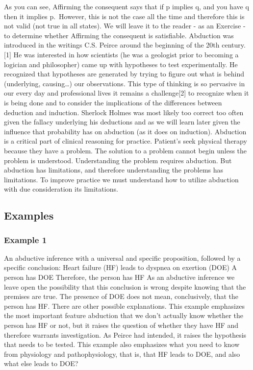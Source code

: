 \documentclass[
]{book}
\begin{document}
As you can see, Affirming the consequent says that if p implies q, and you have q then it implies p.~However, this is not the case all the time and therefore this is not valid (not true in all states). We will leave it to the reader - as an Exercise - to determine whether Affirming the consequent is satisfiable.
Abduction was introduced in the writings C.S. Peirce around the beginning of the 20th century.{[}1{]} He was interested in how scientists (he was a geologist prior to becoming a logician and philosopher) came up with hypotheses to test experimentally. He recognized that hypotheses are generated by trying to figure out what is behind (underlying, causing\ldots) our observations. This type of thinking is so pervasive in our every day and professional lives it remains a challenge{[}2{]} to recognize when it is being done and to consider the implications of the differences between deduction and induction. Sherlock Holmes was most likely too correct too often given the fallacy underlying his deductions and as we will learn later given the influence that probability has on abduction (as it does on induction).
Abduction is a critical part of clinical reasoning for practice. Patient's seek physical therapy because they have a problem. The solution to a problem cannot begin unless the problem is understood. Understanding the problem requires abduction. But abduction has limitations, and therefore understanding the problems has limitations. To improve practice we must understand how to utilize abduction with due consideration its limitations.

\hypertarget{examples-1}{%
\subsection{Examples}\label{examples-1}}

\hypertarget{example-1-1}{%
\subsubsection{Example 1}\label{example-1-1}}

An abductive inference with a universal and specific proposition, followed by a specific conclusion:
Heart failure (HF) leads to dyspnea on exertion (DOE)
A person has DOE
Therefore, the person has HF
As an abductive inference we leave open the possibility that this conclusion is wrong despite knowing that the premises are true. The presence of DOE does not mean, conclusively, that the person has HF. There are other possible explanations.
This example emphasizes the most important feature abduction that we don't actually know whether the person has HF or not, but it raises the question of whether they have HF and therefore warrants investigation. As Peirce had intended, it raises the hypothesis that needs to be tested. This example also emphasizes what you need to know from physiology and pathophysiology, that is, that HF leads to DOE, and also what else leads to DOE?
\end{document}
